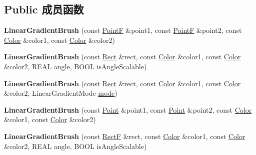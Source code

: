 \subsection*{Public 成员函数}
\begin{DoxyCompactItemize}
\item 
\mbox{\label{class_linear_gradient_brush_a30b2418ee2873bfd7dd4bea0fee7b27b}} 
{\bfseries Linear\+Gradient\+Brush} (const \hyperlink{struct_point_f}{PointF} \&point1, const \hyperlink{struct_point_f}{PointF} \&point2, const \hyperlink{struct_color}{Color} \&color1, const \hyperlink{struct_color}{Color} \&color2)
\item 
\mbox{\label{class_linear_gradient_brush_aed48eb43e0f7d198fb4830e74f109544}} 
{\bfseries Linear\+Gradient\+Brush} (const \hyperlink{struct_rect}{Rect} \&rect, const \hyperlink{struct_color}{Color} \&color1, const \hyperlink{struct_color}{Color} \&color2, R\+E\+AL angle, B\+O\+OL is\+Angle\+Scalable)
\item 
\mbox{\label{class_linear_gradient_brush_ac48c951f0e2e2cba3a48b6b851234573}} 
{\bfseries Linear\+Gradient\+Brush} (const \hyperlink{struct_rect}{Rect} \&rect, const \hyperlink{struct_color}{Color} \&color1, const \hyperlink{struct_color}{Color} \&color2, Linear\+Gradient\+Mode \hyperlink{interfacevoid}{mode})
\item 
\mbox{\label{class_linear_gradient_brush_a60e889681d09283a180ba752fd487fc2}} 
{\bfseries Linear\+Gradient\+Brush} (const \hyperlink{struct_point}{Point} \&point1, const \hyperlink{struct_point}{Point} \&point2, const \hyperlink{struct_color}{Color} \&color1, const \hyperlink{struct_color}{Color} \&color2)
\item 
\mbox{\label{class_linear_gradient_brush_aa96178b1f9e3abb2c15fa45324d3fa20}} 
{\bfseries Linear\+Gradient\+Brush} (const \hyperlink{struct_rect_f}{RectF} \&rect, const \hyperlink{struct_color}{Color} \&color1, const \hyperlink{struct_color}{Color} \&color2, R\+E\+AL angle, B\+O\+OL is\+Angle\+Scalable)
\item 
\mbox{\label{class_linear_gradient_brush_ac6809269fcf428ec0f336bcb1e521f6a}} 

\end{DoxyCompactItemize}
